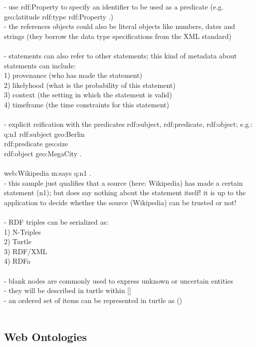 - use rdf:Property to specify an identifier to be used as a predicate (e.g. geo:latitude rdf:type rdf:Property .) \\
- the references objects could also be literal objects like numbers, dates and strings (they borrow the data type specifications from the XML standard)	\\
\\
- statements can also refer to other statements; this kind of metadata about statements can include: \\
  1) provenance (who has made the statement) \\
	2) likelyhood (what is the probability of this statement) \\
	3) context (the setting in which the statement is valid) \\
	4) timeframe (the time constraints for this statement) \\
\\
- explicit reification with the predicates rdf:subject, rdf:predicate, rdf:object; e.g.: \\
    q:n1 rdf:subject geo:Berlin \\
		     rdf:predicate geo:size \\
				 rdf:object geo:MegaCity . \\
\\
    web:Wikipedia m:says q:n1 .
\\
- this sample just qualifies that a source (here: Wikipedia) has made a certain statement (n1); but does say nothing about the
statement itself! it is up to the application to decide whether the source (Wikipedia) can be trusted or not! \\
\\
- RDF triples can be serialized as: \\
    1) N-Triples \\
		2) Turtle \\
		3) RDF/XML \\
		4) RDFa \\
\\
- blank nodes are commonly used to express unknown or uncertain entities \\
- they will be described in turtle within [] \\
- an ordered set of items can be represented in turtle as () \\
\\

\subsection{Web Ontologies}
\label{sec:semantic_ontologies}

